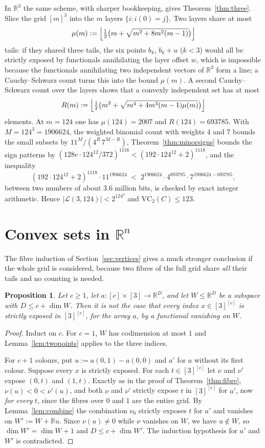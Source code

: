 \documentclass[11pt,a4paper]{article}
\theoremstyle{plain}
\newtheorem{proposition}[theorem]{Proposition}
\theoremstyle{definition}
\newcommand{\R}{\mathbb{R}}
\begin{document}
In $\R^{3}$ the same scheme, with sharper bookkeeping, gives Theorem~\ref{thm:three}. Slice the
grid $[m]^{3}$ into the $m$ layers $\{i:i(0)=j\}$. Two layers share at most
\[
  \mu(m):=\Bigl\lfloor\tfrac12\bigl(m+\sqrt{m^{2}+8m^{2}(m-1)}\bigr)\Bigr\rfloor
\]
tails: if they shared three tails, the six points $b_k$, $b_k+u$ ($k<3$) would all be strictly
exposed by functionals annihilating the layer offset $w$, which is impossible because the
functionals annihilating two independent vectors of $\R^{3}$ form a line; a Cauchy--Schwarz count
turns this into the bound $\mu(m)$. A second Cauchy--Schwarz count over the layers shows that a
convexly independent set has at most
\[
  R(m):=\Bigl\lfloor\tfrac12\bigl(m^{2}+\sqrt{m^{4}+4m^{3}(m-1)\mu(m)}\bigr)\Bigr\rfloor
\]
elements. At $m=124$ one has $\mu(124)=2007$ and $R(124)=693785$. With $M=124^{3}=1906624$, the
weighted binomial count with weights $4$ and $7$ bounds the small subsets by
$11^{M}/(4^{R}\,7^{M-R})$, Theorem~\ref{thm:minorsigns} bounds the sign patterns by
$(128e\cdot124^{12}/372)^{1116}<(192\cdot124^{12}+2)^{1118}$, and the inequality
\[
  (192\cdot124^{12}+2)^{1118}\cdot11^{1906624}\;<\;2^{1906624}\cdot4^{693785}\cdot7^{1906624-693785},
\]
between two numbers of about $3.6$ million bits, is checked by exact integer arithmetic. Hence
$|\mathcal{L}(3,124)|<2^{124^{3}}$ and $\mathrm{VC}_2(C)\le123$.

\section{Convex sets in \texorpdfstring{$\R^{n}$}{R\^{}n}}\label{sec:below}

The fibre induction of Section~\ref{sec:vertices} gives a much stronger conclusion if the whole
grid is considered, because two fibres of the full grid share \emph{all} their tails and no
counting is needed.

\begin{proposition}\label{prop:full}
Let $c\ge1$, let $a\colon[c]\times[3]\to\R^D$, and let $W\le\R^D$ be a subspace
with $D\le c+\dim W$. Then it is not the case that every index $x\in[3]^{[c]}$ is strictly exposed
in $[3]^{[c]}$, for the array $a$, by a functional vanishing on $W$.
\end{proposition}

\begin{proof}
Induct on $c$. For $c=1$, $W$ has codimension at most $1$ and Lemma~\ref{lem:twopoints} applies to
the three indices.

For $c+1$ colours, put $u:=a(0,1)-a(0,0)$ and $a'$ for $a$ without its first colour. Suppose every
$x$ is strictly exposed. For each $t\in[3]^{[c]}$ let $\nu$ and $\nu'$ expose $(0,t)$ and $(1,t)$.
Exactly as in the proof of Theorem~\ref{thm:fibre}, $\nu(u)<0<\nu'(u)$, and both $\nu$ and $\nu'$
strictly expose $t$ in $[3]^{[c]}$ for $a'$, now \emph{for every} $t$, since the fibres over $0$ and
$1$ are the entire grid. By Lemma~\ref{lem:combine} the combination $\nu_0$ strictly exposes $t$
for $a'$ and vanishes on $W':=W+\R u$. Since $\nu(u)\neq0$ while $\nu$ vanishes on $W$, we have
$u\notin W$, so $\dim W'=\dim W+1$ and $D\le c+\dim W'$. The induction hypothesis for $a'$ and $W'$
is contradicted.
\end{proof}
\end{document}
